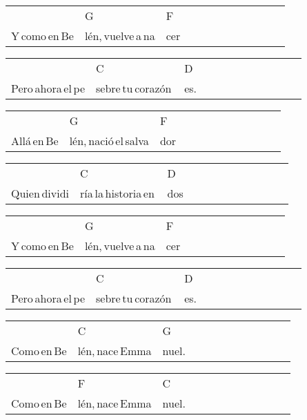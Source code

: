 \begin{multicols}{2}
\begin{minipage}{\columnwidth}
\noindent
\begin{tabular}{llllllllllll}
&G&F\\
Y\,como\,en\,Be&lén,\,vuelve\,a\,na&cer
\end{tabular}

\noindent
\begin{tabular}{llllllllllll}
&C&D\\
Pero\,ahora\,el\,pe&sebre\,tu\,corazón\,&es.
\end{tabular}

\noindent
\begin{tabular}{llllllllllll}
&G&F\\
Allá\,en\,Be&lén,\,nació\,el\,salva&dor
\end{tabular}

\noindent
\begin{tabular}{llllllllllll}
&C&D\\
Quien\,dividi&ría\,la\,historia\,en\,&dos
\end{tabular}

\noindent
\begin{tabular}{llllllllllll}
&G&F\\
Y\,como\,en\,Be&lén,\,vuelve\,a\,na&cer
\end{tabular}

\noindent
\begin{tabular}{llllllllllll}
&C&D\\
Pero\,ahora\,el\,pe&sebre\,tu\,corazón\,&es.
\end{tabular}

\noindent
\begin{tabular}{llllllllllll}
&C&G\\
Como\,en\,Be&lén,\,nace\,Emma&nuel.
\end{tabular}

\noindent
\begin{tabular}{llllllllllll}
&F&C\\
Como\,en\,Be&lén,\,nace\,Emma&nuel.
\end{tabular}
\end{minipage}\\

\end{multicols}